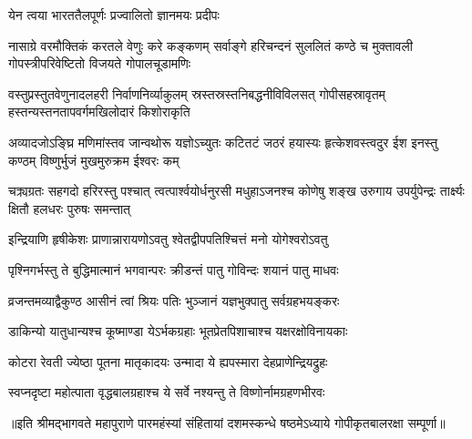 

{येन त्वया भारततैलपूर्णः प्रज्वालितो ज्ञानमयः प्रदीपः}

{नासाग्रे वरमौक्तिकं करतले वेणुः करे कङ्कणम्}
{सर्वाङ्गे हरिचन्दनं सुललितं कण्ठे च मुक्तावली}
{गोपस्त्रीपरिवेष्टितो विजयते गोपालचूडामणिः}

{वस्तुप्रस्तुतवेणुनादलहरी निर्वाणनिर्व्याकुलम्}
{स्रस्तस्रस्तनिबद्धनीविविलसत् गोपीसहस्रावृतम्}
{हस्तन्यस्तनतापवर्गमखिलोदारं किशोराकृति}


\fourlineindentedshloka
{अव्यादजोऽङ्घ्रि मणिमांस्तव जान्वथोरू}
{यज्ञोऽच्युतः कटितटं जठरं हयास्यः}
{हृत्केशवस्त्वदुर ईश इनस्तु कण्ठम्}
{विष्णुर्भुजं मुखमुरुक्रम ईश्वरः कम्}

\fourlineindentedshloka
{चक्र्यग्रतः सहगदो हरिरस्तु पश्चात्}
{त्वत्पार्श्वयोर्धनुरसी मधुहाऽजनश्च}
{कोणेषु शङ्ख उरुगाय उपर्युपेन्द्रः}
{तार्क्ष्यः क्षितौ हलधरः पुरुषः समन्तात्}

\twolineshloka
{इन्द्रियाणि हृषीकेशः प्राणान्नारायणोऽवतु}
{श्वेतद्वीपपतिश्चित्तं मनो योगेश्वरोऽवतु}

\twolineshloka
{पृश्निगर्भस्तु ते बुद्धिमात्मानं भगवान्परः}
{क्रीडन्तं पातु गोविन्दः शयानं पातु माधवः}

\twolineshloka
{व्रजन्तमव्याद्वैकुण्ठ आसीनं त्वां श्रियः पतिः}
{भुञ्जानं यज्ञभुक्पातु सर्वग्रहभयङ्करः}

\twolineshloka
{डाकिन्यो यातुधान्यश्च कूष्माण्डा येऽर्भकग्रहाः}
{भूतप्रेतपिशाचाश्च यक्षरक्षोविनायकाः}

\twolineshloka
{कोटरा रेवती ज्येष्ठा पूतना मातृकादयः}
{उन्मादा ये ह्यपस्मारा देहप्राणेन्द्रियद्रुहः}

\twolineshloka
{स्वप्नदृष्टा महोत्पाता वृद्धबालग्रहाश्च ये}
{सर्वे नश्यन्तु ते विष्णोर्नामग्रहणभीरवः}

{॥इति श्रीमद्भागवते महापुराणे पारमहंस्यां संहितायां दशमस्कन्धे षष्ठमेऽध्याये गोपीकृतबालरक्षा सम्पूर्णा॥}